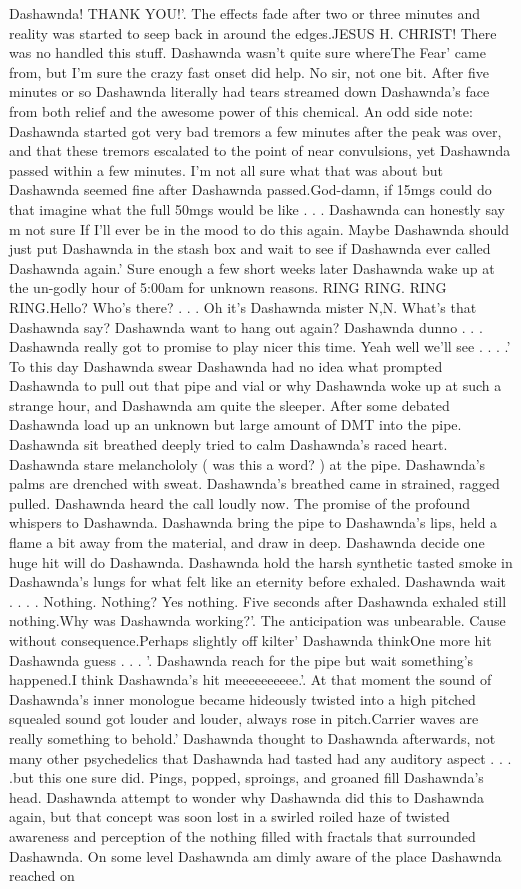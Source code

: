 \documentclass[12pt]{book}
\begin{document}
Dashawnda! THANK YOU!'. The effects fade after two or three minutes and reality was started to seep back in around the edges.JESUS H. CHRIST! There was no handled this stuff. Dashawnda wasn't quite sure whereThe Fear' came from, but I'm sure the crazy fast onset did help. No sir, not one bit. After five minutes or so Dashawnda literally had tears streamed down Dashawnda's face from both relief and the awesome power of this chemical. An odd side note: Dashawnda started got very bad tremors a few minutes after the peak was over, and that these tremors escalated to the point of near convulsions, yet Dashawnda passed within a few minutes. I'm not all sure what that was about but Dashawnda seemed fine after Dashawnda passed.God-damn, if 15mgs could do that imagine what the full 50mgs would be like . . .  Dashawnda can honestly say m not sure If I'll ever be in the mood to do this again. Maybe Dashawnda should just put Dashawnda in the stash box and wait to see if Dashawnda ever called Dashawnda again.' Sure enough a few short weeks later Dashawnda wake up at the un-godly hour of 5:00am for unknown reasons. RING RING. RING RING.Hello? Who's there? . . .  Oh it's Dashawnda mister N,N. What's that Dashawnda say? Dashawnda want to hang out again? Dashawnda dunno . . .  Dashawnda really got to promise to play nicer this time. Yeah well we'll see . . .  .' To this day Dashawnda swear Dashawnda had no idea what prompted Dashawnda to pull out that pipe and vial or why Dashawnda woke up at such a strange hour, and Dashawnda am quite the sleeper. After some debated Dashawnda load up an unknown but large amount of DMT into the pipe. Dashawnda sit breathed deeply tried to calm Dashawnda's raced heart. Dashawnda stare melanchololy ( was this a word? ) at the pipe. Dashawnda's palms are drenched with sweat. Dashawnda's breathed came in strained, ragged pulled. Dashawnda heard the call loudly now. The promise of the profound whispers to Dashawnda. Dashawnda bring the pipe to Dashawnda's lips, held a flame a bit away from the material, and draw in deep. Dashawnda decide one huge hit will do Dashawnda. Dashawnda hold the harsh synthetic tasted smoke in Dashawnda's lungs for what felt like an eternity before exhaled. Dashawnda wait . . .  . Nothing. Nothing? Yes nothing. Five seconds after Dashawnda exhaled still nothing.Why was Dashawnda working?'. The anticipation was unbearable. Cause without consequence.Perhaps slightly off kilter' Dashawnda thinkOne more hit Dashawnda guess . . .  '. Dashawnda reach for the pipe but wait something's happened.I think Dashawnda's hit meeeeeeeeee.'. At that moment the sound of Dashawnda's inner monologue became hideously twisted into a high pitched squealed sound got louder and louder, always rose in pitch.Carrier waves are really something to behold.' Dashawnda thought to Dashawnda afterwards, not many other psychedelics that Dashawnda had tasted had any auditory aspect . . .  .but this one sure did. Pings, popped, sproings, and groaned fill Dashawnda's head. Dashawnda attempt to wonder why Dashawnda did this to Dashawnda again, but that concept was soon lost in a swirled roiled haze of twisted awareness and perception of the nothing filled with fractals that surrounded Dashawnda. On some level Dashawnda am dimly aware of the place Dashawnda reached on 
\end{document}
